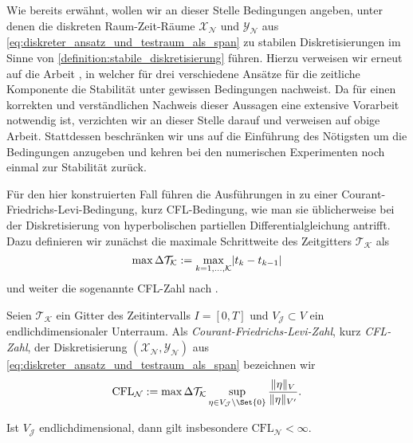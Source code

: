 \documentclass[../main.tex]{subfiles}
\begin{document}
Wie bereits erwähnt, wollen wir an dieser Stelle Bedingungen angeben, unter denen die diskreten Raum-Zeit-Räume $\mathcal X_{\mathcal N}$ und $\mathcal Y_{\mathcal N}$ aus \cref{eq:diskreter_ansatz_und_testraum_als_span} zu stabilen Diskretisierungen im Sinne von \cref{definition:stabile_diskretisierung} führen.
Hierzu verweisen wir erneut auf die Arbeit \cite[Section 5.2]{Andreev:2012ep}, in welcher \citeauthor{Andreev:2012ep} für drei verschiedene Ansätze für die zeitliche Komponente die Stabilität unter gewissen Bedingungen nachweist.
Da für einen korrekten und verständlichen Nachweis dieser Aussagen eine extensive Vorarbeit notwendig ist, verzichten wir an dieser Stelle darauf und verweisen auf obige Arbeit.
Stattdessen beschränken wir uns auf die Einführung des Nötigsten um die Bedingungen anzugeben und kehren bei den numerischen Experimenten noch einmal zur Stabilität zurück.

Für den hier konstruierten Fall führen die Ausführungen in \cite{Andreev:2012ep} zu einer Courant-Friedrichs-Levi-Bedingung, kurz CFL-Bedingung, wie man sie üblicherweise bei der Diskretisierung von hyperbolischen partiellen Differentialgleichung antrifft.
Dazu definieren wir zunächst die maximale Schrittweite des Zeitgitters $\mathcal T_{\mathcal K}$ als
\begin{equation}
    \label{eq:maximale_zeitschrittweite}
    \max \Delta \mathcal T_{\mathcal K} := \max_{k = 1, \dots, \mathcal K} \lvert t_{k} - t_{k - 1}\rvert
\end{equation}
und weiter die sogenannte CFL-Zahl nach \cite[62]{Andreev:2012ep}.

\begin{Definition}
    Seien $\mathcal T_{\mathcal K}$ ein Gitter des Zeitintervalls $I = [0, T]$ und $V_{\mathcal J} \subset V$ ein endlichdimensionaler Unterraum.
    Als \emph{Courant-Friedrichs-Levi-Zahl}, kurz \emph{CFL-Zahl}, der Diskretisierung $(\mathcal X_{\mathcal N}, \mathcal Y_{\mathcal N})$ aus \cref{eq:diskreter_ansatz_und_testraum_als_span} bezeichnen wir
    \begin{equation}
        \label{eq:cfl_zahl}
        \mathrm{CFL}_{\mathcal N} := \max \Delta \mathcal T_{\mathcal K} \sup_{\eta \in V_{\mathcal J} \setminus \Set{0} } \frac{\norm{\eta}_{V}}{\norm{\eta}_{V'}}.
    \end{equation}
\end{Definition}

\begin{Bemerkung}
    Ist $V_{\mathcal J}$ endlichdimensional, dann gilt insbesondere $\mathrm{CFL}_{\mathcal N} < \infty$.
\end{Bemerkung}
\end{document}
